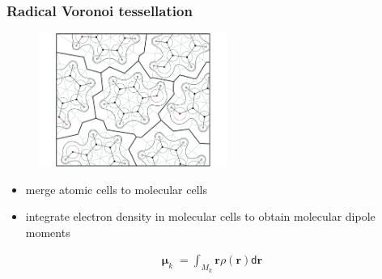 \documentclass[t]{beamer}
\begin{document}
	\begin{frame}
	    \frametitle{Radical Voronoi tessellation}
	    \begin{figure}
            \includegraphics[width=0.55\textwidth]{figures/MT_voronoi.pdf}
        \end{figure}
        \begin{itemize}
            \item merge atomic cells to molecular cells
            \item integrate electron density in molecular cells to obtain molecular dipole moments
        \end{itemize}
        \begin{align*}
            \boldsymbol\upmu_k = \int_{M_k} \mathbf{r} \rho(\mathbf{r}) \mathsf{d}\mathbf{r}
        \end{align*}	
	\end{frame}
\end{document}
